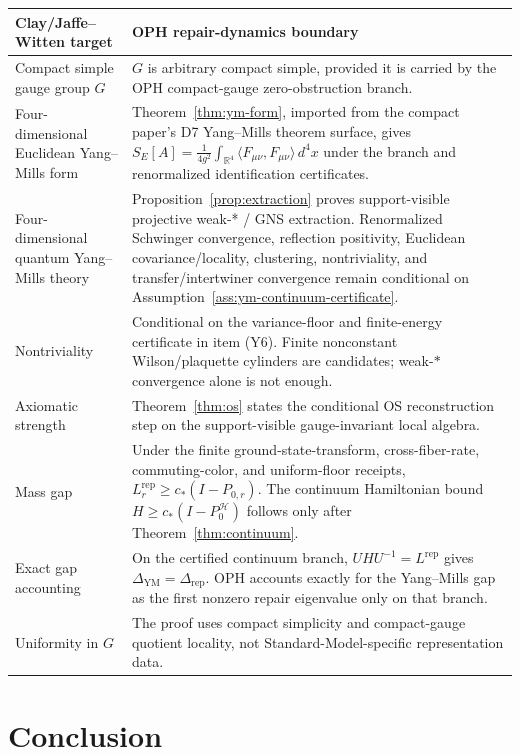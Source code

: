 \documentclass[11pt]{article}
\numberwithin{equation}{section}
\theoremstyle{remark}
\newcommand{\YM}{\mathrm{YM}}
\newcommand{\Rep}{\mathrm{rep}}
\newcommand{\Hcal}{\mathcal H}
\newcommand{\R}{\mathbb R}
\begin{document}
\begin{longtable}{@{}L{0.30\textwidth}L{0.62\textwidth}@{}}
\toprule
Clay/Jaffe--Witten target & OPH repair-dynamics boundary \\
\midrule
\endhead
Compact simple gauge group \(G\) & \(G\) is arbitrary compact simple, provided it is carried by the OPH compact-gauge zero-obstruction branch. \\
Four-dimensional Euclidean Yang--Mills form & Theorem~\ref{thm:ym-form}, imported from the compact paper's D7 Yang--Mills theorem surface, gives \(S_E[A]=\frac{1}{4g^2}\int_{\R^4}\langle F_{\mu\nu},F_{\mu\nu}\rangle\,d^4x\) under the branch and renormalized identification certificates. \\
Four-dimensional quantum Yang--Mills theory & Proposition~\ref{prop:extraction} proves support-visible projective weak-* / GNS extraction. Renormalized Schwinger convergence, reflection positivity, Euclidean covariance/locality, clustering, nontriviality, and transfer/intertwiner convergence remain conditional on Assumption~\ref{ass:ym-continuum-certificate}. \\
Nontriviality & Conditional on the variance-floor and finite-energy certificate in item (Y6). Finite nonconstant Wilson/plaquette cylinders are candidates; weak-\(*\) convergence alone is not enough. \\
Axiomatic strength & Theorem~\ref{thm:os} states the conditional OS reconstruction step on the support-visible gauge-invariant local algebra. \\
Mass gap & Under the finite ground-state-transform, cross-fiber-rate, commuting-color, and uniform-floor receipts, \(L_r^{\Rep}\ge c_*(I-P_{0,r})\). The continuum Hamiltonian bound \(H\ge c_*(I-P_0^{\Hcal})\) follows only after Theorem~\ref{thm:continuum}. \\
Exact gap accounting & On the certified continuum branch, \(UHU^{-1}=L^{\mathrm{rep}}\) gives \(\Delta_{\YM}=\Delta_{\mathrm{rep}}\). OPH accounts exactly for the Yang--Mills gap as the first nonzero repair eigenvalue only on that branch. \\
Uniformity in \(G\) & The proof uses compact simplicity and compact-gauge quotient locality, not Standard-Model-specific representation data. \\
\bottomrule
\end{longtable}

\section{Conclusion}
\end{document}
